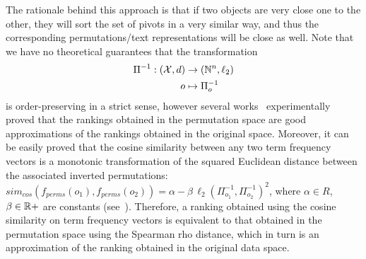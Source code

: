 The rationale behind this approach is that if two objects are very close one to the other, they will sort the set of pivots in a very similar way, and thus the corresponding permutations/text representations will be close as well.
Note that we have no theoretical guarantees that the transformation
\begin{align}
\Pi^{-1} : (\mathcal{X},d) &\to (\mathbb{N}^n, \ell_2)\\
o &\mapsto \Pi^{-1}_{o}
\end{align}
is order-preserving in a strict sense, however several works~\cite{amato2014mi,gonzalez2008effective,esuli2009mipai} experimentally proved that the rankings obtained in the permutation space are good approximations of the rankings obtained in the original space.
Moreover, it can be easily proved that the cosine similarity between any two term frequency vectors is a monotonic transformation of the squared Euclidean distance between the associated inverted permutations: $sim_{cos}(f_{perms}(o_1), f_{perms}(o_2))=\alpha - \beta\,\ell_2(\Pi^{-1}_{o_1},\Pi^{-1}_{o_2})^2 $, where $\alpha \in R{}$, $\beta \in \mathbb{R}+$ are constants (see~\cite{vadicamo2016using,vadicamo2018enhancing}).
Therefore, a ranking obtained using the cosine similarity on term frequency vectors is equivalent to that obtained in the permutation space using the Spearman rho distance, which in turn is an approximation of the ranking obtained in the original data space.

